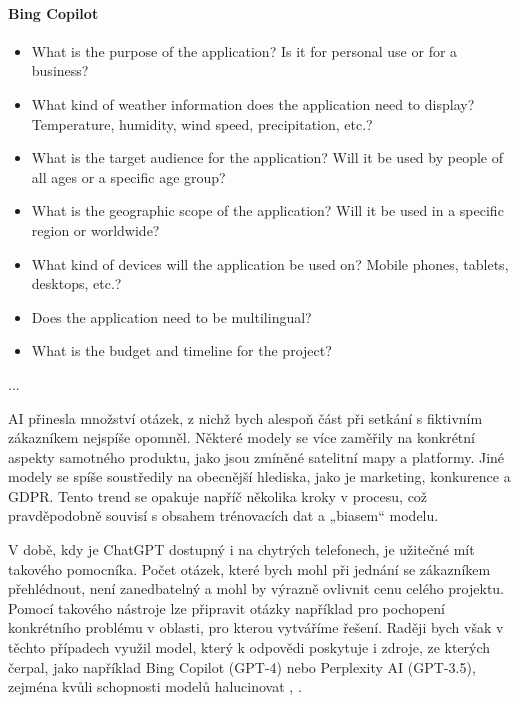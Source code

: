 \documentclass[FM,DP]{tulthesis}
\begin{document}
		\vspace{0.6em}
		\begin{tcolorbox}[colback=white,colframe=black]
			\paragraph{Bing Copilot} 
			\begin{itemize}
				\item What is the purpose of the application? Is it for personal use or for a business?
				\item What kind of weather information does the application need to display? Temperature, humidity, wind speed, precipitation, etc.?
				\item What is the target audience for the application? Will it be used by people of all ages or a specific age group?
				\item What is the geographic scope of the application? Will it be used in a specific region or worldwide?
				\item What kind of devices will the application be used on? Mobile phones, tablets, desktops, etc.?
				\item Does the application need to be multilingual?
				\item What is the budget and timeline for the project? 
			\end{itemize}
			... \cite{bingCopilot_analyza}
		\end{tcolorbox}
		\vspace{0.6em}
		
		AI přinesla množství otázek, z nichž bych alespoň část při setkání s fiktivním zákazníkem nejspíše opomněl. Některé modely se více zaměřily na konkrétní aspekty samotného produktu, jako jsou zmíněné satelitní mapy a platformy. Jiné modely se spíše soustředily na obecnější hlediska, jako je marketing, konkurence a GDPR. Tento trend se opakuje napříč několika kroky v procesu, což pravděpodobně souvisí s obsahem trénovacích dat a „biasem“ modelu.
		
		V době, kdy je ChatGPT dostupný i na chytrých telefonech, je užitečné mít takového pomocníka. Počet otázek, které bych mohl při jednání se zákazníkem přehlédnout, není zanedbatelný a mohl by výrazně ovlivnit cenu celého projektu. Pomocí takového nástroje lze připravit otázky například pro pochopení konkrétního problému v oblasti, pro kterou vytváříme řešení. Raději bych však v těchto případech využil model, který k odpovědi poskytuje i zdroje, ze kterých čerpal, jako například Bing Copilot (GPT-4) nebo Perplexity AI (GPT-3.5), zejména kvůli schopnosti modelů halucinovat \cite{bingCopilot}, \cite{perplexity}.
		
\end{document}
